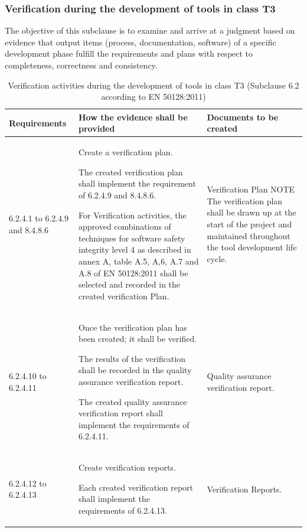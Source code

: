 \documentclass{template/openetcs_report}
\begin{document}
\subsubsection{Verification during the development of tools in class T3}
\begin{flushleft}
The objective of this subclause is to examine and arrive at a judgment based on evidence that output items (process, documentation, software) of a specific development phase fulfill the requirements and plans with respect to completeness, correctness and consistency.
\end{flushleft}
{\footnotesize\sffamily\centering
\begin{longtable}{|p{2cm}|p{9cm}|p{3cm}|}
\caption{Verification activities during the development of tools in class T3 (Subclause 6.2 according to EN 50128:2011)}\\
\hline
\bfseries Requirements & \bfseries How the evidence shall be provided & \bfseries Documents to be created\\
\hline
\hline
\endhead
\hline
\endfoot

6.2.4.1 to 6.2.4.9 and 8.4.8.6 & Create a verification plan.

The created verification plan shall implement the requirement of 6.2.4.9 and 8.4.8.6.

For Verification activities, the approved combinations of techniques for software safety integrity level 4 as described in annex A, table A.5, A,6, A.7 and A.8 of EN 50128:2011 shall be selected and recorded in the created verification Plan.
& Verification Plan
\linebreak
\linebreak
NOTE\linebreak
The verification plan shall be drawn up at the start of the project and maintained throughout the tool development life cycle.\\ 
\hline
6.2.4.10 to 6.2.4.11 & Once the verification plan has been created; it shall be verified. 

The results of the verification shall be recorded in the quality assurance verification report.

The created quality assurance verification report shall implement the requirements of 6.2.4.11.
& Quality assurance verification report.\\ 
\hline
6.2.4.12 to 6.2.4.13 & Create verification reports.

Each created verification report shall implement the requirements of 6.2.4.13.
& Verification Reports.\\ 
\hline
\end{longtable}}
\end{document}
